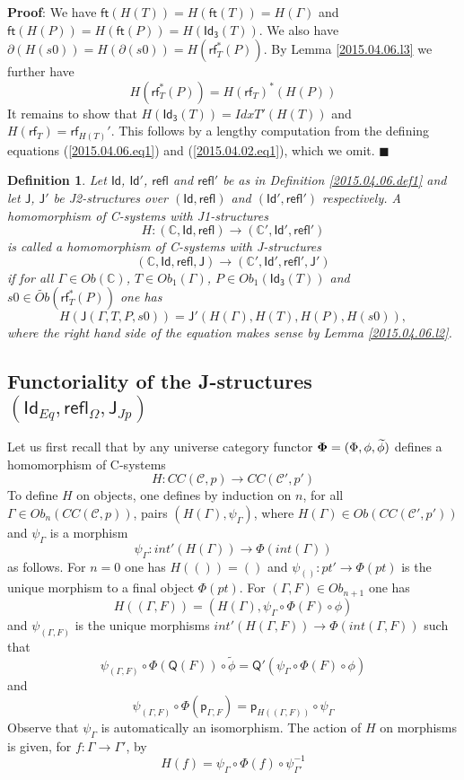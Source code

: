 \documentclass[12pt]{article}
\numberwithin{equation}{section}
\newenvironment{myproof}{{\bf Proof}:}{$\blacksquare$ \vskip 5mm }
\newtheorem{definition}[proposition]{Definition}
\newcommand{\sr}{\rightarrow}
\newcommand{\wt}{\widetilde}
\newcommand{\toCC}{CC} %
\newcommand{\CC}{{\mathbb C}}  %
\newcommand{\C}{{\mathcal C}}  %
\newcommand{\ft}{\mathsf{ft}}
\newcommand{\p}{\mathsf{p}}
\newcommand{\Id}{\mathsf{Id}} %
\newcommand{\Idx}{\mathsf{Id_3}} %
\newcommand{\refl}{\mathsf{refl}}
\newcommand{\J}{\mathsf{J}}
\newcommand{\rf}{\mathsf{rf}}
\newcommand{\Q}{\mathsf{Q}}
\newcommand{\Obwt}{\wt{Ob}}
\begin{document}
%
\begin{myproof}
We have $\ft(H(T))=H(\ft(T))=H(\Gamma)$ and $\ft(H(P))=H(\ft(P))=H(\Idx(T))$. We
also have $\partial(H(s0))=H(\partial(s0))=H(\rf_T^*(P))$. By Lemma
\ref{2015.04.06.l3} we further have
%
$$H(\rf_T^*(P))=H(\rf_T)^*(H(P))$$
%
It remains to show that $H(\Idx(T))=IdxT'(H(T))$ and $H(\rf_T)=\rf_{H(T)}'$. This
follows by a lengthy computation from the defining
equations (\ref{2015.04.06.eq1}) and (\ref{2015.04.02.eq1}), which we omit.
\end{myproof}
%
\begin{definition}
\label{2015.04.06.def2} Let $\Id$, $\Id'$, $\refl$ and $\refl'$ be as in
Definition \ref{2015.04.06.def1} and let $\J$, $\J'$ be J2-structures over
$(\Id,\refl)$ and $(\Id',\refl')$ respectively. A homomorphism of C-systems with
J1-structures
%
$$H:(\CC,\Id,\refl)\sr (\CC',\Id',\refl')$$
%
is called a homomorphism of C-systems with J-structures
%
$$(\CC,\Id,\refl,\J)\sr (\CC',\Id',\refl',\J')$$
%
if for all $\Gamma\in Ob(\CC)$, $T\in Ob_1(\Gamma)$, $P\in Ob_1(\Idx(T))$ and
$s0\in \Obwt(\rf_T^*(P))$ one has
%
$$H(\J(\Gamma,T,P,s0))=\J'(H(\Gamma),H(T),H(P),H(s0)),$$
%
where the right hand side of the equation makes sense by Lemma
\ref{2015.04.06.l2}.
\end{definition}
%











\subsection{Functoriality of the J-structures $(\Id_{Eq},\refl_{\Omega},\J_{Jp})$}
%
\label{2015.04.12.sec1}
%
Let us first recall that by \cite[Construction 3.3]{Cfromauniverse} any
universe category functor ${\bf \Phi}=(\Phi,\phi,\wt{\phi})$ defines a
homomorphism of C-systems
%
$$H:\toCC({\C},p)\sr \toCC({\C}',p')$$
%
To define $H$ on objects, one defines by induction on $n$, for all $\Gamma\in
Ob_n(\toCC({\C},p))$, pairs $(H(\Gamma),\psi_{\Gamma})$, where
$H(\Gamma)\in Ob(\toCC({\C}',p'))$ and $\psi_{\Gamma}$ is a morphism
%
$$\psi_{\Gamma}:int'(H(\Gamma))\sr \Phi(int(\Gamma))$$
%
as follows. For $n=0$ one has $H(())=()$ and $\psi_{()}:pt'\sr \Phi(pt)$ is the
unique morphism to a final object $\Phi(pt)$. For $(\Gamma,F)\in Ob_{n+1}$ one
has
%
$$H((\Gamma,F))=(H(\Gamma),\psi_{\Gamma}\circ\Phi(F)\circ \phi)$$
%
and $\psi_{(\Gamma,F)}$ is the unique morphisms $int'(H(\Gamma,F))\sr
\Phi(int(\Gamma,F))$ such that
%
$$\psi_{(\Gamma,F)}\circ
\Phi(\Q(F))\circ\wt{\phi}=\Q'(\psi_{\Gamma}\circ\Phi(F)\circ\phi)$$
%
and
%
$$\psi_{(\Gamma,F)}\circ \Phi(\p_{\Gamma,F})=\p_{H((\Gamma,F))}\circ
\psi_{\Gamma}$$
%
Observe that $\psi_{\Gamma}$ is automatically an isomorphism. The action of $H$
on morphisms is given, for $f:\Gamma\sr\Gamma'$, by
%
$$H(f)=\psi_{\Gamma}\circ\Phi(f)\circ\psi_{\Gamma'}^{-1}$$
%
\end{document}
